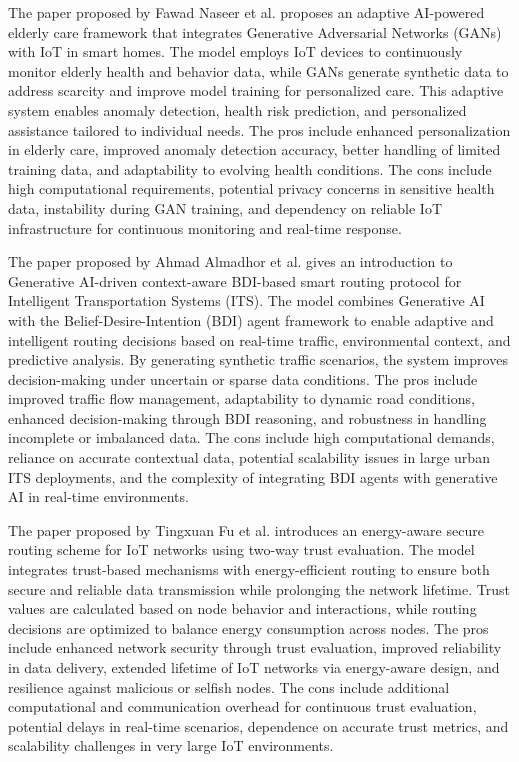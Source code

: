 \documentclass[a4paper,fleqn]{cas-dc}
\numberwithin{equation}{section}
\begin{document}
The paper proposed by Fawad Naseer et al.\cite{Naseer2025} proposes an adaptive AI-powered elderly care framework that integrates Generative Adversarial Networks (GANs) with IoT in smart homes. The model employs IoT devices to continuously monitor elderly health and behavior data, while GANs generate synthetic data to address scarcity and improve model training for personalized care. This adaptive system enables anomaly detection, health risk prediction, and personalized assistance tailored to individual needs. The pros include enhanced personalization in elderly care, improved anomaly detection accuracy, better handling of limited training data, and adaptability to evolving health conditions. The cons include high computational requirements, potential privacy concerns in sensitive health data, instability during GAN training, and dependency on reliable IoT infrastructure for continuous monitoring and real-time response.


The paper proposed by Ahmad Almadhor et al.\cite{Almadhor2025} gives an introduction to Generative AI-driven context-aware BDI-based smart routing protocol for Intelligent Transportation Systems (ITS). The model combines Generative AI with the Belief-Desire-Intention (BDI) agent framework to enable adaptive and intelligent routing decisions based on real-time traffic, environmental context, and predictive analysis. By generating synthetic traffic scenarios, the system improves decision-making under uncertain or sparse data conditions. The pros include improved traffic flow management, adaptability to dynamic road conditions, enhanced decision-making through BDI reasoning, and robustness in handling incomplete or imbalanced data. The cons include high computational demands, reliance on accurate contextual data, potential scalability issues in large urban ITS deployments, and the complexity of integrating BDI agents with generative AI in real-time environments.

The paper proposed by Tingxuan Fu et al.\cite{Fu2024} introduces an energy-aware secure routing scheme for IoT networks using two-way trust evaluation. The model integrates trust-based mechanisms with energy-efficient routing to ensure both secure and reliable data transmission while prolonging the network lifetime. Trust values are calculated based on node behavior and interactions, while routing decisions are optimized to balance energy consumption across nodes. The pros include enhanced network security through trust evaluation, improved reliability in data delivery, extended lifetime of IoT networks via energy-aware design, and resilience against malicious or selfish nodes. The cons include additional computational and communication overhead for continuous trust evaluation, potential delays in real-time scenarios, dependence on accurate trust metrics, and scalability challenges in very large IoT environments.
\end{document}
